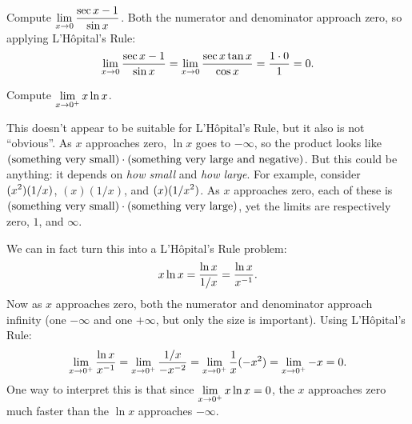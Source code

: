 \begin{example} Compute $\displaystyle\lim_{x\to 0}{\sec x - 1\over \sin x}$.
\msk
Both the numerator and denominator approach zero, so applying 
L'H\^opital's Rule:
$$\lim_{x\to 0}{\sec x - 1\over \sin x}=
\lim_{x\to 0}{\sec x\tan x\over \cos x}={1\cdot 0\over 1}=0.$$
\vskip -16pt
\end{example}

\begin{example} Compute $\displaystyle\lim_{x\to 0^+} x\ln x$.

This doesn't appear to be suitable for L'H\^opital's Rule, but it also
is not ``obvious''. As $x$ approaches zero, $\ln x$ goes to $-\infty$,
so the product looks like $(\hbox{something very small})\cdot 
(\hbox{something very large and negative})$. But this could be
anything: it depends on {\it how small\/} and {\it how large}. 
For example, consider $\displaystyle (x^2)(1/x)$, $(x)(1/x)$, and $\displaystyle (x)(1/x^2)$. As
$x$ approaches zero, each of these is $(\hbox{something very small})\cdot 
(\hbox{something very large})$, yet the limits are respectively 
zero, $1$, and $\infty$.

We can
in fact turn this into a L'H\^opital's Rule problem:
$$x\ln x = {\ln x\over 1/x}={\ln x\over x^{-1}}.$$
Now as $x$ approaches zero, both the numerator and denominator
approach infinity (one $-\infty$ and one $+\infty$, but only the size
is important). Using  L'H\^opital's Rule:
$$\lim_{x\to 0^+} {\ln x\over x^{-1}}=
\lim_{x\to 0^+} {1/x\over -x^{-2}} =\lim_{x\to 0^+} {1\over x}(-x^2)=
\lim_{x\to 0^+} -x = 0.$$
One way to interpret this is that since $\displaystyle\lim_{x\to
  0^+}x\ln x = 0$, the $x$ approaches zero much faster than the $\ln x$
approaches $-\infty$.
\end{example}

